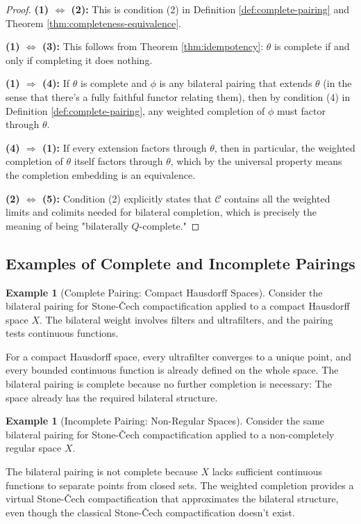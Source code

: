 \documentclass[11pt]{article}
\theoremstyle{plain}
\theoremstyle{definition}
\newtheorem{example}[theorem]{Example}
\theoremstyle{remark}
\newcommand{\C}{\mathcal{C}}
\begin{document}
\begin{proof}
\textbf{(1) $\Leftrightarrow$ (2):} This is condition (2) in Definition \ref{def:complete-pairing} and Theorem \ref{thm:completeness-equivalence}.

\textbf{(1) $\Leftrightarrow$ (3):} This follows from Theorem \ref{thm:idempotency}: $\theta$ is complete if and only if completing it does nothing.

\textbf{(1) $\Rightarrow$ (4):} If $\theta$ is complete and $\phi$ is any bilateral pairing that extends $\theta$ (in the sense that there's a fully faithful functor relating them), then by condition (4) in Definition \ref{def:complete-pairing}, any weighted completion of $\phi$ must factor through $\theta$.

\textbf{(4) $\Rightarrow$ (1):} If every extension factors through $\theta$, then in particular, the weighted completion of $\theta$ itself factors through $\theta$, which by the universal property means the completion embedding is an equivalence.

\textbf{(2) $\Leftrightarrow$ (5):} Condition (2) explicitly states that $\C$ contains all the weighted limits and colimits needed for bilateral completion, which is precisely the meaning of being "bilaterally $Q$-complete."
\end{proof}

\subsection{Examples of Complete and Incomplete Pairings}

\begin{example}[Complete Pairing: Compact Hausdorff Spaces]
Consider the bilateral pairing for Stone-\v{C}ech compactification applied to a compact Hausdorff space $X$. The bilateral weight involves filters and ultrafilters, and the pairing tests continuous functions.

For a compact Hausdorff space, every ultrafilter converges to a unique point, and every bounded continuous function is already defined on the whole space. The bilateral pairing is complete because no further completion is necessary: The space already has the required bilateral structure.
\end{example}

\begin{example}[Incomplete Pairing: Non-Regular Spaces]
Consider the same bilateral pairing for Stone-\v{C}ech compactification applied to a non-completely regular space $X$. 

The bilateral pairing is not complete because $X$ lacks sufficient continuous functions to separate points from closed sets. The weighted completion provides a virtual Stone-\v{C}ech compactification that approximates the bilateral structure, even though the classical Stone-\v{C}ech compactification doesn't exist.
\end{example}
\end{document}

